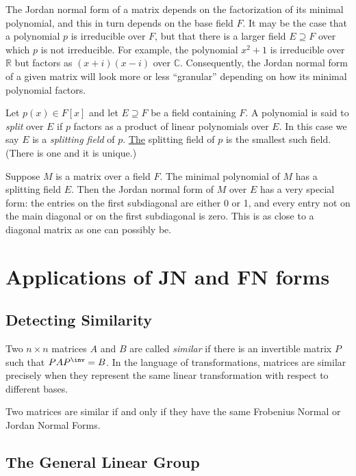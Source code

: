 \documentclass{memoir}
\begin{document}
The Jordan normal form of a matrix depends on the factorization of its minimal polynomial, and this in turn depends on the base field $F$. It may be the case that a polynomial $p$ is irreducible over $F$, but that there is a larger field $E \supseteq F$ over which $p$ is not irreducible. For example, the polynomial $x^2+1$ is irreducible over $\mathbb{R}$ but factors as $(x+i)(x-i)$ over $\mathbb{C}$. Consequently, the Jordan normal form of a given matrix will look more or less ``granular'' depending on how its minimal polynomial factors.

\begin{dfn}
Let $p(x) \in F[x]$ and let $E \supseteq F$ be a field containing $F$. A polynomial is said to \emph{split} over $E$ if $p$ factors as a product of linear polynomials over $E$. In this case we say $E$ is a \emph{splitting field} of $p$. \underline{The} splitting field of $p$ is the smallest such field. (There is one and it is unique.)
\end{dfn}

Suppose $M$ is a matrix over a field $F$. The minimal polynomial of $M$ has a splitting field $E$. Then the Jordan normal form of $M$ over $E$ has a very special form: the entries on the first subdiagonal are either 0 or 1, and every entry not on the main diagonal or on the first subdiagonal is zero. This is as close to a diagonal matrix as one can possibly be.

\section{Applications of JN and FN forms}

\subsection*{Detecting Similarity}

Two $n \times n$ matrices $A$ and $B$ are called \emph{similar} if there is an invertible matrix $P$ such that $PAP^\inv = B$. In the language of transformations, matrices are similar precisely when they represent the same linear transformation with respect to different bases.

\begin{prp}
Two matrices are similar if and only if they have the same Frobenius Normal or Jordan Normal Forms.
\end{prp}

\subsection*{The General Linear Group}
\end{document}
